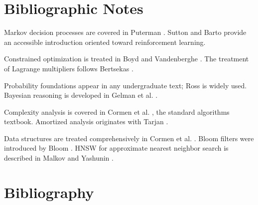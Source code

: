\documentclass[11pt]{book}
\begin{document}
\section*{Bibliographic Notes}

Markov decision processes are covered in Puterman \cite{puterman1994markov}. Sutton and Barto \cite{sutton2018reinforcement} provide an accessible introduction oriented toward reinforcement learning.

Constrained optimization is treated in Boyd and Vandenberghe \cite{boyd2004convex}. The treatment of Lagrange multipliers follows Bertsekas \cite{bertsekas1999nonlinear}.

Probability foundations appear in any undergraduate text; Ross \cite{ross2014first} is widely used. Bayesian reasoning is developed in Gelman et al. \cite{gelman2013bayesian}.

Complexity analysis is covered in Cormen et al. \cite{cormen2009introduction}, the standard algorithms textbook. Amortized analysis originates with Tarjan \cite{tarjan1985amortized}.

Data structures are treated comprehensively in Cormen et al. \cite{cormen2009introduction}. Bloom filters were introduced by Bloom \cite{bloom1970space}. HNSW for approximate nearest neighbor search is described in Malkov and Yashunin \cite{malkov2018efficient}.

\section*{Bibliography}
\end{document}
